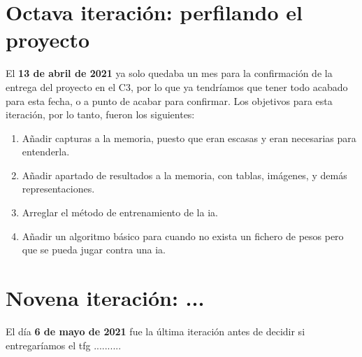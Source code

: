 \section{Octava iteración: perfilando el proyecto}
El \textbf{13 de abril de 2021} ya solo quedaba un mes para la confirmación de la entrega del proyecto en el C3, por lo que ya tendríamos que tener todo acabado para esta fecha, o a punto de acabar para confirmar. Los objetivos para esta iteración, por lo tanto, fueron los siguientes:
\begin{enumerate}
	\item Añadir capturas a la memoria, puesto que eran escasas y eran necesarias para entenderla.
	\item Añadir apartado de resultados a la memoria, con tablas, imágenes, y demás representaciones.
	\item Arreglar el método de entrenamiento de la \gls{ia}.
	\item Añadir un algoritmo básico para cuando no exista un fichero de pesos pero que se pueda jugar contra una \gls{ia}.
\end{enumerate}

\section{Novena iteración: ...}
El día \textbf{6 de mayo de 2021} fue la última iteración antes de decidir si entregaríamos el \gls{tfg} ..........